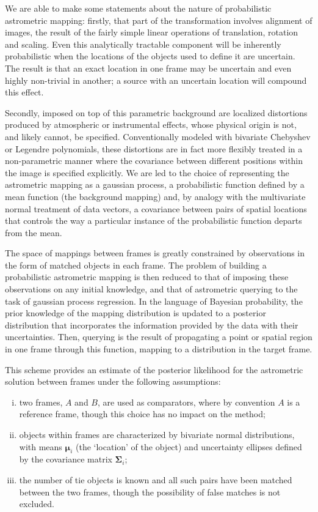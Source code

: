 \documentclass[manuscript]{aastex}
\begin{document}
We are able to make some statements about the nature of probabilistic astrometric mapping: firstly, that part of the transformation involves alignment of images, the result of the fairly simple linear operations of translation, rotation and scaling. Even this analytically tractable component will be inherently probabilistic when the locations of the objects used to define it are uncertain. The result is that an exact location in one frame may be uncertain and even highly non-trivial in another; a source with an uncertain location will compound this effect.

Secondly, imposed on top of this  parametric background are localized distortions produced by atmospheric or instrumental effects, whose physical origin is not, and likely cannot, be specified. Conventionally modeled with bivariate Chebyshev or Legendre polynomials, these distortions are in fact more flexibly treated in a non-parametric manner where the covariance between different positions within the image is specified explicitly. We are led to the choice of representing the astrometric mapping as a gaussian process, a probabilistic function defined by a mean function (the background mapping) and, by analogy with the multivariate normal treatment of data vectors, a covariance between pairs of spatial locations that controls the way a particular instance of the probabilistic function departs from the mean.

The space of mappings between frames is greatly constrained by observations in the form of matched objects in each frame. The problem of building a probabilistic astrometric mapping is then reduced to that of imposing these observations on any initial knowledge, and that of astrometric querying to the task of gaussian process regression. In the language of Bayesian probability, the prior knowledge of the mapping distribution is updated to a posterior distribution that incorporates the information provided by the data with their uncertainties. Then, querying is the result of propagating a point or spatial region in one frame through this function, mapping to a distribution in the target frame. 

This scheme provides an estimate of the posterior likelihood  for the astrometric solution between frames under the following assumptions: 
\begin{enumerate}[(i)]
\item two frames, $A$ and $B$, are used as comparators, where by convention $A$ is a reference frame, though this choice has no impact on the method;
\item objects within frames are characterized by bivariate normal distributions, with means $\boldsymbol\mu_i$ (the `location' of the object) and uncertainty ellipses defined by the covariance matrix $\boldsymbol\Sigma_i$;
\item the number of tie objects is known and all such pairs have been matched between the two frames, though the possibility of false matches is not excluded.
\end{enumerate}
\end{document}
